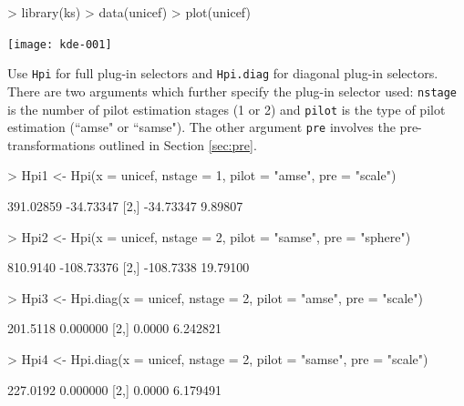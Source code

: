 \documentclass[a4paper,11pt]{article}
\begin{document}
\begin{center}
\begin{Schunk}
\begin{Sinput}
> library(ks)
> data(unicef)
> plot(unicef)
\end{Sinput}
\end{Schunk}
\texttt{[image: kde-001]}
\end{center}

Use \texttt{Hpi} for 
full plug-in selectors and \texttt{Hpi.diag} for diagonal plug-in selectors.
There are two arguments which further specify the plug-in selector
used: \texttt{nstage} is the number of pilot estimation stages (1 or 2)
and \texttt{pilot} is the type of pilot estimation (``amse" or ``samse").
The other argument \texttt{pre} involves the pre-transformations outlined
in Section \ref{sec:pre}. 
\begin{Schunk}
\begin{Sinput}
> Hpi1 <- Hpi(x = unicef, nstage = 1, pilot = "amse", pre = "scale")
\end{Sinput}
\begin{Soutput}
          [,1]      [,2]
[1,] 391.02859 -34.73347
[2,] -34.73347   9.89807
\end{Soutput}
\begin{Sinput}
> Hpi2 <- Hpi(x = unicef, nstage = 2, pilot = "samse", pre = "sphere")
\end{Sinput}
\begin{Soutput}
          [,1]       [,2]
[1,]  810.9140 -108.73376
[2,] -108.7338   19.79100
\end{Soutput}
\begin{Sinput}
> Hpi3 <- Hpi.diag(x = unicef, nstage = 2, pilot = "amse", pre = "scale")
\end{Sinput}
\begin{Soutput}
         [,1]     [,2]
[1,] 201.5118 0.000000
[2,]   0.0000 6.242821
\end{Soutput}
\begin{Sinput}
> Hpi4 <- Hpi.diag(x = unicef, nstage = 2, pilot = "samse", pre = "scale")
\end{Sinput}
\begin{Soutput}
         [,1]     [,2]
[1,] 227.0192 0.000000
[2,]   0.0000 6.179491
\end{Soutput}
\end{Schunk}
\end{document}
